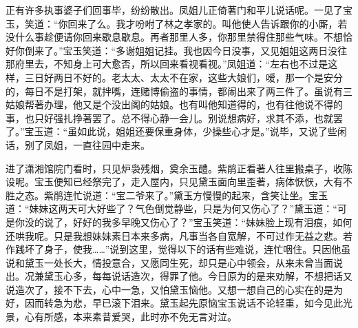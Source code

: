 \begin{parag}
    正有许多执事婆子们回事毕，纷纷散出。凤姐儿正倚著门和平儿说话呢。一见了宝玉，笑道：“你回来了么。我才吩咐了林之孝家的。叫他使人告诉跟你的小厮，若没什么事趁便请你回来歇息歇息。再者那里人多，你那里禁得住那些气味。不想恰好你倒来了。”宝玉笑道：“多谢姐姐记挂。我也因今日没事，又见姐姐这两日没往那府里去，不知身上可大愈否，所以回来看视看视。”凤姐道：“左右也不过是这样，三日好两日不好的。老太太、太太不在家，这些大娘们，嗳，那一个是安分的，每日不是打架，就拌嘴，连赌博偷盗的事情，都闹出来了两三件了。虽说有三姑娘帮著办理，他又是个没出阁的姑娘。也有叫他知道得的，也有往他说不得的事，也只好强扎挣著罢了。总不得心静一会儿。别说想病好，求其不添，也就罢了。”宝玉道：“虽如此说，姐姐还要保重身体，少操些心才是。”说毕，又说了些闲话，别了凤姐，一直往园中走来。
\end{parag}


\begin{parag}
    进了潇湘馆院门看时，只见炉袅残烟，奠余玉醴。紫鹃正看著人往里搬桌子，收陈设呢。宝玉便知已经祭完了，走入屋内，只见黛玉面向里歪著，病体恹恹，大有不胜之态。紫鹃连忙说道：“宝二爷来了。”黛玉方慢慢的起来，含笑让坐。宝玉道：“妹妹这两天可大好些了？气色倒觉静些，只是为何又伤心了？”黛玉道：“可是你没的说了，好好的我多早晚又伤心了？”宝玉笑道：“妹妹脸上现有泪痕，如何还哄我呢。只是我想妹妹素日本来多病，凡事当各自宽解，不可过作无益之悲。若作践坏了身子，使我……”说到这里，觉得以下的话有些难说，连忙咽住。只因他虽说和黛玉一处长大，情投意合，又愿同生死，却只是心中领会，从来未曾当面说出。况兼黛玉心多，每每说话造次，得罪了他。今日原为的是来劝解，不想把话又说造次了，接不下去，心中一急，又怕黛玉恼他。又想一想自己的心实在的是为好，因而转急为悲，早已滚下泪来。黛玉起先原恼宝玉说话不论轻重，如今见此光景，心有所感，本来素昔爱哭，此时亦不免无言对泣。
\end{parag}


